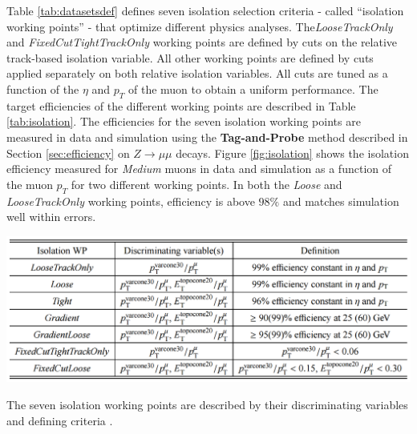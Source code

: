 \par \hspace{20pt} Table \ref{tab:datasetsdef} defines seven isolation selection criteria - called ``isolation working points'' - that optimize different physics analyses. The\textit{LooseTrackOnly} and \textit{FixedCutTightTrackOnly} working points are defined by cuts on the relative track-based isolation variable. All other working points are defined by cuts applied separately on both relative isolation variables. All cuts are tuned as a function of the $\eta$ and $p_T$ of the muon to obtain a uniform performance. The target efficiencies of the different working points are described in Table \ref{tab:isolation}. The efficiencies for the seven isolation working points are measured in data and simulation using the \textbf{Tag-and-Probe} method described in Section \ref{sec:efficiency} on $Z \rightarrow \mu\mu$ decays. Figure \ref{fig:isolation} shows the isolation efficiency measured for \textit{Medium} muons in data and simulation as a function of the muon $p_T$ for two different working points. In both the \textit{Loose} and \textit{LooseTrackOnly} working points, efficiency is above $98\%$ and matches simulation well within errors. 

\begin{table}[!h]
	\centering 
    \includegraphics[width=.9\textwidth]{Pictures/isolationworkingpoints.PNG}
    \caption{The seven isolation working points are described by their discriminating variables and defining criteria \cite{MCPpaper}.}
    \label{tab:isolation}
\end{table}


